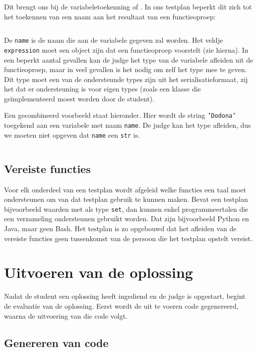 Dit brengt ons bij de variabeletoekenning of .
In ons testplan beperkt dit zich tot het toekennen van een naam aan het resultaat van een functieoproep:

\inputminted{json}{code/assignment.json}

De \texttt{name} is de naam die aan de variabele gegeven zal worden.
Het veldje \texttt{expression} moet een object zijn dat een functieoproep voorstelt (zie hierna).
In een beperkt aantal gevallen kan de judge het type van de variabele afleiden uit de functieoproep, maar in veel gevallen is het nodig om zelf het type mee te geven.
Dit type moet een van de ondersteunde types zijn uit het serialisatieformaat, zij het dat er ondersteuning is voor eigen types (zoals een klasse die geïmplementeerd moest worden door de student).

Een gecombineerd voorbeeld staat hieronder.
Hier wordt de string \texttt{'Dodona'} toegekend aan een variabele met naam \texttt{name}.
De judge kan het type afleiden, dus we moeten niet opgeven dat \texttt{name} een \texttt{str} is.

\inputminted{json}{code/assign-variable.json}

\subsection{Vereiste functies}\label{subsec:vereiste-functies}

Voor elk onderdeel van een testplan wordt afgeleid welke functies een taal moet ondersteunen om van dat testplan gebruik te kunnen maken.
Bevat een testplan bijvoorbeeld waarden met als type \texttt{set}, dan kunnen enkel programmeertalen die een verzameling ondersteunen gebruikt worden.
Dat zijn bijvoorbeeld Python en Java, maar geen Bash.
Het testplan is zo opgebouwd dat het afleiden van de vereiste functies geen tussenkomst van de persoon die het testplan opstelt vereist.

\section{Uitvoeren van de oplossing}\label{sec:uitvoeren-van-de-oplossing}

Nadat de student een oplossing heeft ingediend en de judge is opgestart, begint de evaluatie van de oplossing.
Eerst wordt de uit te voeren code gegenereerd, waarna de uitvoering van die code volgt.

\subsection{Genereren van code}\label{subsec:genereren-van-code}

